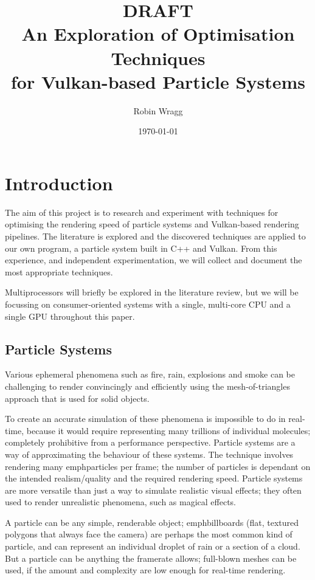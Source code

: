 \documentclass[11pt, a4paper, twocolumn]{article}
\title{\sffamily\bfseries DRAFT\\An Exploration of Optimisation Techniques\\for Vulkan-based Particle Systems}
\author{Robin Wragg}
\date{\today}
\begin{document}
\maketitle

\section{Introduction}

The aim of this project is to research and experiment with techniques for optimising the rendering speed of particle systems and Vulkan-based rendering pipelines. The literature is explored and the discovered techniques are applied to our own program, a particle system built in C++ and Vulkan. From this experience, and independent experimentation, we will collect and document the most appropriate techniques.

Multiprocessors will briefly be explored in the literature review, but we will be focussing on consumer-oriented systems with a single, multi-core CPU and a single GPU throughout this paper.

\subsection{Particle Systems}

Various ephemeral phenomena such as fire, rain, explosions and smoke can be challenging to render convincingly and efficiently using the mesh-of-triangles approach that is used for solid objects.

To create an accurate simulation of these phenomena is impossible to do in real-time, because it would require representing many trillions of individual molecules; completely prohibitive from a performance perspective. Particle systems are a way of approximating the behaviour of these systems. The technique involves rendering many emph{particles} per frame; the number of particles is dependant on the intended realism/quality and the required rendering speed. Particle systems are more versatile than just a way to simulate realistic visual effects; they often used to render unrealistic phenomena, such as magical effects.

A particle can be any simple, renderable object; emph{billboards} (flat, textured polygons that always face the camera) are perhaps the most common kind of particle, and can represent an individual droplet of rain or a section of a cloud. But a particle can be anything the framerate allows; full-blown meshes can be used, if the amount and complexity are low enough for real-time rendering.
\end{document}
